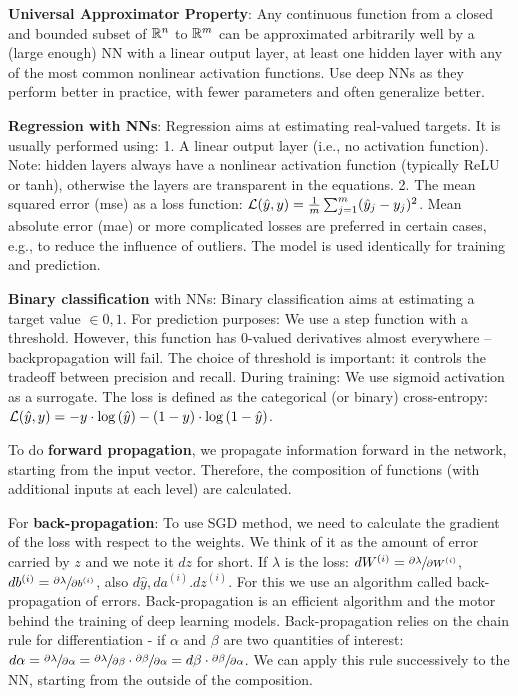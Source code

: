 \textbf{Universal Approximator Property}: Any continuous function from a closed and bounded subset of $\mathbb{R}^n$ to $\mathbb{R}^m$ can be approximated arbitrarily well by a (large enough) NN with a linear output layer, at least one hidden layer with any of the most common nonlinear activation functions.
Use deep NNs as they perform better in practice, with fewer parameters and often generalize better.

\textbf{Regression with NNs}: Regression aims at estimating real-valued targets.
It is usually performed using:
1. A linear output layer (i.e., no activation function). Note: hidden layers always have a nonlinear activation function (typically ReLU or tanh), otherwise the layers are transparent in the equations.
2. The mean squared error (mse) as a loss function: $\mathcal{L}(\hat{y}, y) = \frac{1}{m} \sum_{j=1}^m (\hat{y}_j - y_j)^2$.
Mean absolute error (mae) or more complicated losses are preferred in certain cases, e.g., to reduce the influence of outliers.
The model is used identically for training and prediction.

\textbf{Binary classification} with NNs: Binary classification aims at estimating a target value $\in{0,1}$.
For prediction purposes:
We use a step function with a threshold.
However, this function has 0-valued derivatives almost everywhere – backpropagation will fail. The choice of threshold is important: it controls the tradeoff between precision and recall.
During training:
We use sigmoid activation as a surrogate.
The loss is defined as the categorical (or binary) cross-entropy:
$\mathcal{L}(\hat{y}, y) = -y \cdot \log{(\hat{y})} - (1-y)\cdot \log{(1-\hat{y})}$.

To do \textbf{forward propagation}, we propagate information forward in the network,
starting from the input vector. Therefore, the composition of functions (with additional inputs at each level) are calculated.

For \textbf{back-propagation}:
To use SGD method, we need to calculate the gradient of the loss with respect to the weights. We think of it as the amount of error carried by $z$ and we note it $dz$ for short. If $\lambda$ is the loss: 
$dW^{(i)} = \sfrac{\partial \lambda}{\partial W^{(i)}}$, $db^{(i)} = \sfrac{\partial \lambda}{\partial b^{(i)}}$, also $d\hat{y}, da^{(i)}. dz^{(i)}$.
For this we use an algorithm called back-propagation of errors. Back-propagation is an efficient algorithm and the motor behind the training of deep learning models.
Back-propagation relies on the chain rule for differentiation - if $\alpha$ and $\beta$ are two quantities of interest: 
$d\alpha = \sfrac{\partial \lambda}{\partial \alpha} =  \sfrac{\partial \lambda}{\partial \beta} \cdot  \sfrac{\partial \beta}{\partial \alpha} = d\beta \cdot  \sfrac{\partial \beta}{\partial \alpha}$.
We can apply this rule successively to the NN, starting from the outside of the composition.

